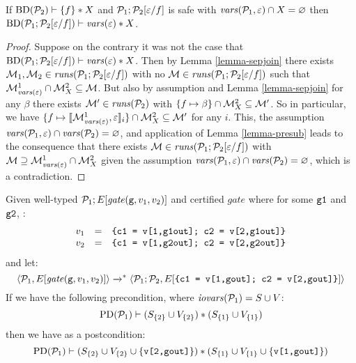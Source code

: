 \begin{lemma}[Substitution]
  \label{lemma-substitution}
  If $\mathrm{BD}(\mathcal{P}_2) \vdash \{ f \} * X$ and
  $\mathcal{P}_1;\mathcal{P}_2[\varepsilon/f]$ is safe with $\mathit{vars}(\mathcal{P}_1,\varepsilon) \cap
  X = \varnothing$ then
  $\mathrm{BD}(\mathcal{P}_1;\mathcal{P}_2[\varepsilon/f]) \vdash \mathit{vars}(\varepsilon) * X$.
\end{lemma}
\begin{proof}
  Suppose on the contrary it was not the case that
  $\mathrm{BD}(\mathcal{P}_1;\mathcal{P}_2[\varepsilon/f]) \vdash \mathit{vars}(\varepsilon) * X$.
  Then by Lemma \ref{lemma-sepjoin} there exists $\mathcal{M}_1,\mathcal{M}_2
  \in \mathit{runs}(\mathcal{P}_1;\mathcal{P}_2[\varepsilon/f])$ with no $\mathcal{M} \in
  \mathit{runs}(\mathcal{P}_1;\mathcal{P}_2[\varepsilon/f])$ such that $\mathcal{M}^1_{\mathit{vars}(\varepsilon)}
  \cap \mathcal{M}^2_X \subseteq \mathcal{M}$.  But also by
  assumption and Lemma \ref{lemma-sepjoin} for any $\beta$ there
  exists $\mathcal{M}' \in \mathit{runs}(\mathcal{P}_2)$ with $\{ f \mapsto \beta \} \cap
  \mathcal{M}^2_X \subseteq \mathcal{M}'$. So in particular, we
  have $\{ f \mapsto \llbracket \mathcal{M}^1_{\mathit{vars}(\varepsilon)},\varepsilon \rrbracket_{i} \} \cap
  \mathcal{M}^2_X \subseteq \mathcal{M}'$ for any $i$. This, the
  assumption $\mathit{vars}(\mathcal{P}_1,\varepsilon) \cap \mathit{vars}(\mathcal{P}_2) = \varnothing$,
  and application of Lemma \ref{lemma-presub} leads to the consequence
  that there exists $\mathcal{M} \in \mathit{runs}(\mathcal{P}_1;\mathcal{P}_2[\varepsilon/f])$ with
  $\mathcal{M} \supseteq \mathcal{M}^1_{\mathit{vars}(\varepsilon)} \cap
  \mathcal{M}^2_X$ given the assumption $\mathit{vars}(\mathcal{P}_1,\varepsilon)
  \cap \mathit{vars}(\mathcal{P}_2) = \varnothing$, which is a contradiction.
\end{proof}

\begin{lemma}
  \label{lemma-preservation-gmw}
  Given well-typed $\mathcal{P}_1;E[\mathit{gate}(\texttt{g},v_1,v_2)]$ and certified $\mathit{gate}$ where
  for some $\texttt{g1}$ and $\texttt{g2}$, :
  $$
  \begin{array}{lcr}
   v_1 &=& \texttt{\{c1 = v[1,g1out]; c2 = v[2,g1out]\}}\\
   v_2 &=& \texttt{\{c1 = v[1,g2out]; c2 = v[2,g2out]\}}
  \end{array}
  $$
  and let:
  $$
  \langle \mathcal{P}_1,E[\mathit{gate}(\texttt{g},v_1,v_2)] \rangle \xrightarrow{}^{*} \langle \mathcal{P}_1;\mathcal{P}_2,E[\texttt{\{c1 = v[1,gout]; c2 = v[2,gout]\}}] \rangle
  $$
  If we have the following precondition, where $\mathit{iovars}(\mathcal{P}_1) = S \cup V$:
  $$
  \mathrm{PD}(\mathcal{P}_1) \vdash (S_{\{2\}} \cup V_{\{2\}}) * (S_{\{1\}} \cup V_{\{1\}})
  $$
  then we have as a postcondition:
  $$
  \mathrm{PD}(\mathcal{P}_1) \vdash (S_{\{2\}} \cup V_{\{2\}} \cup \{ \texttt{v[2,gout]} \}) * (S_{\{1\}} \cup V_{\{1\}} \cup \{ \texttt{v[1,gout]} \})
  $$
\end{lemma}

